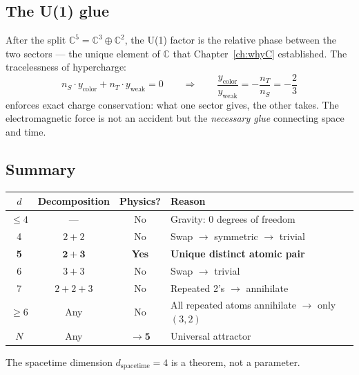 \documentclass[12pt]{article}
\theoremstyle{remark}
\theoremstyle{definition}
\newcommand{\CC}{\mathbb{C}}
\begin{document}
\subsection{The U(1) glue}
\label{sec:glue}

After the split $\CC^5 = \CC^3 \oplus \CC^2$, the U(1) factor is the relative phase between the two sectors --- the unique element of $\CC$ that Chapter~\ref{ch:whyC} established. The tracelessness of hypercharge:
\begin{equation}
n_S \cdot y_\text{color} + n_T \cdot y_\text{weak} = 0 \qquad\Rightarrow\qquad \frac{y_\text{color}}{y_\text{weak}} = -\frac{n_T}{n_S} = -\frac{2}{3}
\end{equation}
enforces exact charge conservation: what one sector gives, the other takes. The electromagnetic force is not an accident but the \emph{necessary glue} connecting space and time.

\subsection{Summary}

\begin{center}
\begin{tabular}{cccl}
\hline
$d$ & Decomposition & Physics? & Reason \\
\hline
$\leq 4$ & --- & No & Gravity: 0 degrees of freedom \\
4 & $2+2$ & No & Swap $\to$ symmetric $\to$ trivial \\
\textbf{5} & $\mathbf{2+3}$ & \textbf{Yes} & \textbf{Unique distinct atomic pair} \\
6 & $3+3$ & No & Swap $\to$ trivial \\
7 & $2+2+3$ & No & Repeated 2's $\to$ annihilate \\
$\geq 6$ & Any & No & All repeated atoms annihilate $\to$ only $(3,2)$ \\
$N$ & Any & $\to \mathbf{5}$ & Universal attractor \\
\hline
\end{tabular}
\end{center}

\noindent The spacetime dimension $d_\text{spacetime} = 4$ is a theorem, not a parameter.

\end{document}

